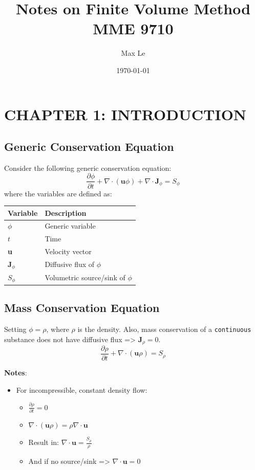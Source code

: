 \documentclass[11pt]{article}
\author{Max Le}
\date{\today}
\title{Notes on Finite Volume Method MME 9710}
\begin{document}
\maketitle
\tableofcontents \clearpage


\section{CHAPTER 1: INTRODUCTION}
\label{sec:orgb167576}
\subsection{Generic Conservation Equation}
\label{sec:orgd9bc937}
Consider the following generic conservation equation:
\begin{equation}
\frac{\partial \phi}{\partial t} + \nabla \cdot (\textbf{u}\phi) + \nabla \cdot \textbf{J}_\phi = S_\phi
\end{equation}
where the variables are defined as:


\begin{center}
\begin{tabular}{ll}
\textbf{Variable} & \textbf{Description}\\
\hline
\(\phi\) & Generic variable\\
\(t\) & Time\\
\textbf{u} & Velocity vector\\
\(\textbf{J}_\phi\) & Diffusive flux of \(\phi\)\\
\(S_\phi\) & Volumetric source/sink of \(\phi\)\\
\hline
\end{tabular}
\end{center}

\subsection{Mass Conservation Equation}
\label{sec:org5f5cc40}
Setting \(\phi = \rho\), where \(\rho\) is the density. Also, mass conservation of a \texttt{continuous} substance does not
have diffusive flux => \(\textbf{J}_\rho = 0\).
\begin{equation}
\frac{\partial \rho}{\partial t} + \nabla \cdot (\textbf{u}\rho) = S_\rho
\end{equation}

\textbf{Notes}:
\begin{itemize}
\item For incompressible, constant density flow:
\begin{itemize}
\item \(\frac{\partial \rho}{\partial t} = 0\)
\item \(\nabla \cdot (\textbf{u}\rho) = \rho \nabla \cdot \textbf{u}\)
\item Result in: \(\nabla \cdot \textbf{u} = \frac{S_\rho}{\rho}\)
\item And if no source/sink => \(\nabla \cdot \textbf{u} = 0\)
\end{itemize}
\end{itemize}
\end{document}
